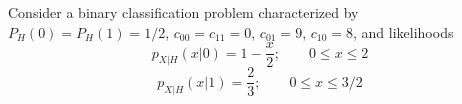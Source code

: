 \begin{solution}
\end{solution}

\else

\question Consider a binary classification problem characterized by $P_H(0) = P_H(1) = 1/2$, $c_{00} = c_{11} = 0$, $c_{01} = 9$, $c_{10} = 8$, and likelihoods
$$p_{X|H}(x|0) = 1-\frac{x}{2}; \quad\quad 0 \leq x \leq 2$$
$$p_{X|H}(x|1) = \frac{2}{3}; \quad\quad 0 \leq x \leq 3/2$$

